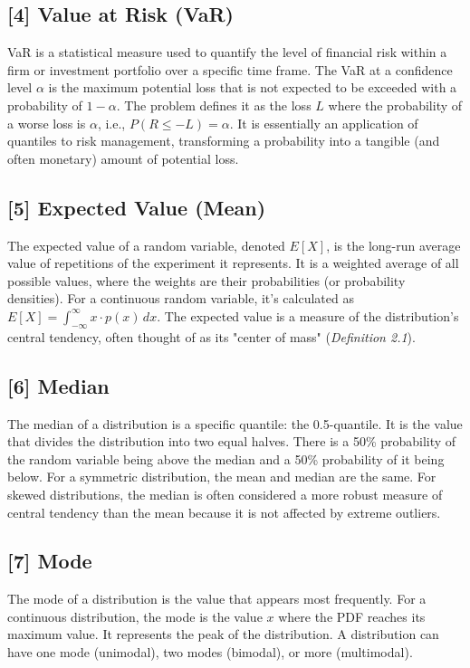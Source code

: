 \documentclass[11pt,a4paper]{article}
\begin{document}
\hypertarget{note:var}{\subsection*{[4] Value at Risk (VaR)}}
VaR is a statistical measure used to quantify the level of financial risk within a firm or investment portfolio over a specific time frame. The VaR at a confidence level $\alpha$ is the maximum potential loss that is not expected to be exceeded with a probability of $1-\alpha$. The problem defines it as the loss $L$ where the probability of a worse loss is $\alpha$, i.e., $P(R \le -L) = \alpha$. It is essentially an application of quantiles to risk management, transforming a probability into a tangible (and often monetary) amount of potential loss.

\hypertarget{note:mean}{\subsection*{[5] Expected Value (Mean)}}
The expected value of a random variable, denoted $E[X]$, is the long-run average value of repetitions of the experiment it represents. It is a weighted average of all possible values, where the weights are their probabilities (or probability densities). For a continuous random variable, it's calculated as $E[X] = \int_{-\infty}^{\infty} x \cdot p(x) \,dx$. The expected value is a measure of the distribution's central tendency, often thought of as its "center of mass" (\textit{Definition 2.1}).

\hypertarget{note:median}{\subsection*{[6] Median}}
The median of a distribution is a specific quantile: the 0.5-quantile. It is the value that divides the distribution into two equal halves. There is a 50\% probability of the random variable being above the median and a 50\% probability of it being below. For a symmetric distribution, the mean and median are the same. For skewed distributions, the median is often considered a more robust measure of central tendency than the mean because it is not affected by extreme outliers.

\hypertarget{note:mode}{\subsection*{[7] Mode}}
The mode of a distribution is the value that appears most frequently. For a continuous distribution, the mode is the value $x$ where the PDF reaches its maximum value. It represents the peak of the distribution. A distribution can have one mode (unimodal), two modes (bimodal), or more (multimodal).
\end{document}
